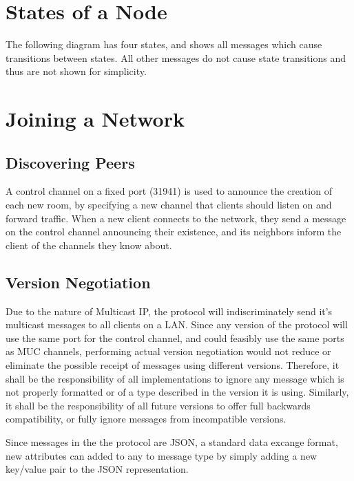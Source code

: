 \documentclass{article}
\begin{document}
\section{States of a Node}
The following diagram has four states, and shows all messages which cause
transitions between states. All other messages do not cause state transitions
and thus are not shown for simplicity.
\begin{center}
\scalebox{.8}{

}
\end{center}
\section{Joining a Network}

\subsection{Discovering Peers}

A control channel on a fixed port (31941) is used to announce the creation of
each new room, by specifying a new channel that clients should listen on and
forward traffic. When a new client connects to the network, they send a message
on the control channel announcing their existence, and its neighbors inform the
client of the channels they know about.

\subsection{Version Negotiation}

Due to the nature of Multicast IP, the protocol will indiscriminately send it's
multicast messages to all clients on a LAN. Since any version of the protocol
will use the same port for the control channel, and could feasibly use the same
ports as MUC channels, performing actual version negotiation would not reduce or
eliminate the possible receipt of messages using different versions. Therefore,
it shall be the responsibility of all implementations to ignore any message
which is not properly formatted or of a type described in the version it is
using. Similarly, it shall be the responsibility of all future versions to offer
full backwards compatibility, or fully ignore messages from incompatible
versions.

Since messages in the the protocol are JSON, a standard data excange format, new 
attributes can added to any to message type by simply adding a new key/value pair
to the JSON representation.
\end{document}
